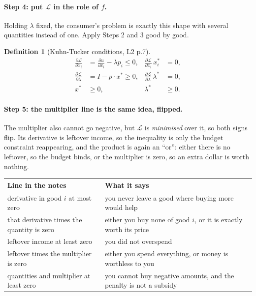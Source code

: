 \documentclass[11pt]{article}
\theoremstyle{definition}
\newtheorem{definition}{Definition}
\newcommand{\xs}{x^*}
\newcommand{\pdd}[2]{\frac{\partial #1}{\partial #2}}
\begin{document}
\paragraph{Step 4: put $\mathcal{L}$ in the role of $f$.} Holding $\lambda$ fixed, the
consumer's problem is exactly this shape with several quantities instead of one. Apply
Steps 2 and 3 good by good.

\begin{definition}[Kuhn-Tucker conditions, L2 p.7]
\begin{align*}
\pdd{\mathcal{L}}{x_i}&=\pdd{u}{x_i}-\lambda p_i\le 0, & \pdd{\mathcal{L}}{x_i}\,x_i^*&=0,\\[2pt]
\pdd{\mathcal{L}}{\lambda}&=I-p\cdot \xs\ge 0, & \pdd{\mathcal{L}}{\lambda}\,\lambda^*&=0,\\[2pt]
\xs&\ge 0, & \lambda^*&\ge 0.
\end{align*}
\end{definition}

\paragraph{Step 5: the multiplier line is the same idea, flipped.} The multiplier also
cannot go negative, but $\mathcal{L}$ is \emph{minimised} over it, so both signs flip. Its
derivative is leftover income, so the inequality is only the budget constraint reappearing,
and the product is again an ``or'': either there is no leftover, so the budget binds, or the
multiplier is zero, so an extra dollar is worth nothing.

\begin{center}
\begin{tabular}{@{}p{6.4cm}p{7.8cm}@{}}
\toprule
\textbf{Line in the notes} & \textbf{What it says} \\
\midrule
derivative in good $i$ at most zero & you never leave a good where buying more would help \\
that derivative times the quantity is zero & either you buy none of good $i$, or it is exactly worth its price \\
leftover income at least zero & you did not overspend \\
leftover times the multiplier is zero & either you spend everything, or money is worthless to you \\
quantities and multiplier at least zero & you cannot buy negative amounts, and the penalty is not a subsidy \\
\bottomrule
\end{tabular}
\end{center}
\end{document}
